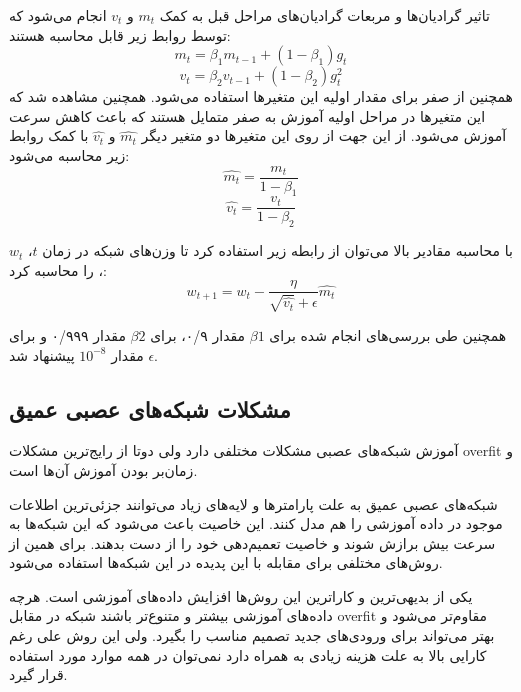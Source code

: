 تاثیر گرادیان‌ها و مربعات گرادیان‌های مراحل قبل به کمک $m_t$ و $v_t$ انجام
می‌شود که توسط روابط زیر قابل محاسبه هستند:
\begin{equation}
    m_t = \beta_1 m_{t-1} + (1 - \beta_1) g_t
\end{equation}
\begin{equation}
    v_t = \beta_2 v_{t-1} + (1 - \beta_2) g_t^2
\end{equation}
همچنین از صفر برای مقدار اولیه این متغیرها استفاده می‌شود. همچنین مشاهده شد که
این متغیرها در مراحل اولیه آموزش به صفر متمایل هستند که باعث کاهش سرعت آموزش
می‌شود. از این جهت از روی این متغیرها دو متغیر دیگر $\hat{m_t}$ و $\hat{v_t}$ با
کمک روابط زیر محاسبه می‌شود:
\begin{equation}
    \hat{m_t} = \frac{m_t}{1 - \beta_1}
\end{equation}
\begin{equation}
    \hat{v_t} = \frac{v_t}{1 - \beta_2}
\end{equation}

با محاسبه مقادیر بالا می‌توان از رابطه زیر استفاده کرد تا وزن‌های شبکه در زمان
$t$، $w_t$، را محاسبه کرد:
\begin{equation}
    w_{t+1} = w_{t} - \frac{\eta}{\sqrt{\hat{v_t}} + \epsilon} \hat{m_t}
\end{equation}

همچنین طی بررسی‌های انجام شده برای $\beta1$ مقدار ۰/۹، برای $\beta2$ مقدار ۰/۹۹۹
و برای $\epsilon$ مقدار $10^{-8}$ پیشنهاد شد.

\subsection{مشکلات شبکه‌های عصبی عمیق}
آموزش شبکه‌های عصبی مشکلات مختلفی دارد ولی دوتا از رایج‌ترین مشکلات \gls{overfit} و
زمان‌بر بودن آموزش آن‌ها است.

شبکه‌های عصبی عمیق به علت پارامترها و لایه‌های زیاد می‌توانند جزئی‌ترین اطلاعات
موجود در داده آموزشی را هم مدل کنند. این خاصیت باعث می‌شود که این شبکه‌ها به
سرعت بیش برازش شوند و خاصیت تعمیم‌دهی خود را از دست بدهند. برای همین از روش‌های
مختلفی برای مقابله با این پدیده در این شبکه‌ها استفاده می‌شود.

یکی از بدیهی‌ترین و کاراترین این روش‌ها افزایش داده‌های آموزشی است. هرچه
داده‌های آموزشی بیشتر و متنوع‌تر باشند شبکه در مقابل \gls{overfit} مقاوم‌تر
می‌شود و بهتر می‌تواند برای ورودی‌های جدید تصمیم مناسب را بگیرد. ولی این روش علی
رغم کارایی بالا به علت هزینه زیادی به همراه دارد نمی‌توان در همه موارد مورد
استفاده قرار گیرد.

